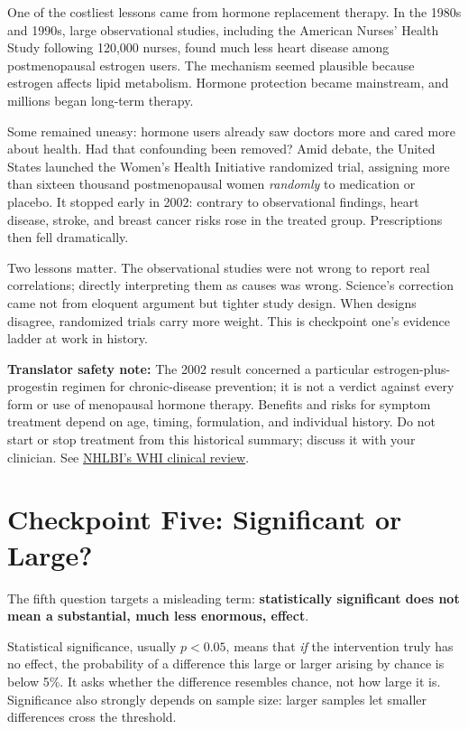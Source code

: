 \begin{zhengju}
One of the costliest lessons came from hormone replacement therapy. In the 1980s and 1990s, large observational studies, including the American Nurses' Health Study following 120,000 nurses, found much less heart disease among postmenopausal estrogen users. The mechanism seemed plausible because estrogen affects lipid metabolism. Hormone protection became mainstream, and millions began long-term therapy.

Some remained uneasy: hormone users already saw doctors more and cared more about health. Had that confounding been removed? Amid debate, the United States launched the Women's Health Initiative randomized trial, assigning more than sixteen thousand postmenopausal women \emph{randomly} to medication or placebo. It stopped early in 2002: contrary to observational findings, heart disease, stroke, and breast cancer risks rose in the treated group. Prescriptions then fell dramatically.

Two lessons matter. The observational studies were not wrong to report real correlations; directly interpreting them as causes was wrong. Science's correction came not from eloquent argument but tighter study design. When designs disagree, randomized trials carry more weight. This is checkpoint one's evidence ladder at work in history.
\end{zhengju}

\textbf{Translator safety note:} The 2002 result concerned a particular estrogen-plus-progestin regimen for chronic-disease prevention; it is not a verdict against every form or use of menopausal hormone therapy. Benefits and risks for symptom treatment depend on age, timing, formulation, and individual history. Do not start or stop treatment from this historical summary; discuss it with your clinician. See \href{https://www.nhlbi.nih.gov/news/2024/researchers-review-findings-and-clinical-messages-womens-health-initiative-30-years-after}{NHLBI's WHI clinical review}.

\section{Checkpoint Five: Significant or Large?}

The fifth question targets a misleading term: \textbf{statistically significant does not mean a substantial, much less enormous, effect}.

Statistical significance, usually $p<0.05$, means that \emph{if} the intervention truly has no effect, the probability of a difference this large or larger arising by chance is below 5\%. It asks whether the difference resembles chance, not how large it is. Significance also strongly depends on sample size: larger samples let smaller differences cross the threshold.

